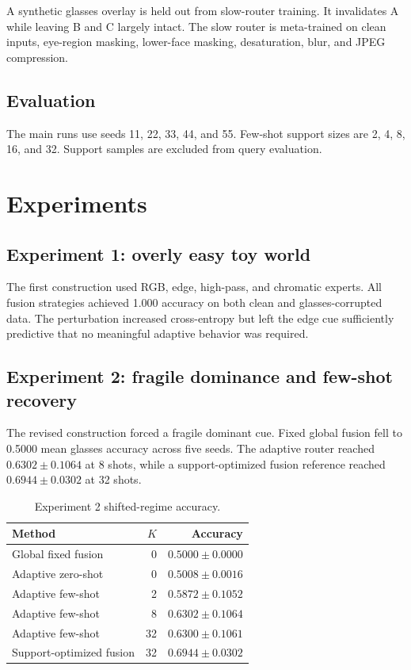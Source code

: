 \documentclass[10pt]{article}
\begin{document}
A synthetic glasses overlay is held out from slow-router training. It invalidates A while leaving B and C largely intact. The slow router is meta-trained on clean inputs, eye-region masking, lower-face masking, desaturation, blur, and JPEG compression.

\subsection{Evaluation}

The main runs use seeds 11, 22, 33, 44, and 55. Few-shot support sizes are 2, 4, 8, 16, and 32. Support samples are excluded from query evaluation.

\section{Experiments}

\subsection{Experiment 1: overly easy toy world}

The first construction used RGB, edge, high-pass, and chromatic experts. All fusion strategies achieved 1.000 accuracy on both clean and glasses-corrupted data. The perturbation increased cross-entropy but left the edge cue sufficiently predictive that no meaningful adaptive behavior was required.

\subsection{Experiment 2: fragile dominance and few-shot recovery}

The revised construction forced a fragile dominant cue. Fixed global fusion fell to 0.5000 mean glasses accuracy across five seeds. The adaptive router reached $0.6302 \pm 0.1064$ at 8 shots, while a support-optimized fusion reference reached $0.6944 \pm 0.0302$ at 32 shots.

\begin{table}[h]
\centering
\caption{Experiment 2 shifted-regime accuracy.}
\begin{tabular}{lrr}
\toprule
Method & $K$ & Accuracy \\
\midrule
Global fixed fusion & 0 & $0.5000 \pm 0.0000$ \\
Adaptive zero-shot & 0 & $0.5008 \pm 0.0016$ \\
Adaptive few-shot & 2 & $0.5872 \pm 0.1052$ \\
Adaptive few-shot & 8 & $\mathbf{0.6302 \pm 0.1064}$ \\
Adaptive few-shot & 32 & $0.6300 \pm 0.1061$ \\
Support-optimized fusion & 32 & $0.6944 \pm 0.0302$ \\
\bottomrule
\end{tabular}
\end{table}
\end{document}
